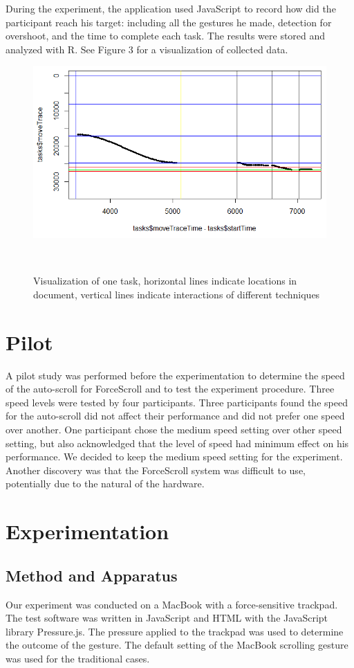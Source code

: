 \documentclass{sigchi}
\begin{document}
During the experiment, the application used JavaScript to record how did the participant reach his target: including all the gestures he made, detection for overshoot, and the time to complete each task. The results were stored and analyzed with R. See Figure 3 for a visualization of collected data.

\begin{figure}[!h]
	\centering
	\includegraphics[width=0.9\columnwidth]{figures/Picture1}
	\caption{Visualization of one task, horizontal lines indicate locations in document, vertical lines indicate interactions of different techniques}~\label{fig:figure3}
\end{figure}

\section{Pilot}
A pilot study was performed before the experimentation to determine the speed of the auto-scroll for ForceScroll and to test the experiment procedure. Three speed levels were tested by four participants. Three participants found the speed for the auto-scroll did not affect their performance and did not prefer one speed over another. One participant chose the medium speed setting over other speed setting, but also acknowledged that the level of speed had minimum effect on his performance. We decided to keep the medium speed setting for the experiment. Another discovery was that the ForceScroll system was difficult to use, potentially due to the natural of the hardware.   


\section{Experimentation}

\subsection{Method and Apparatus}
Our experiment was conducted on a MacBook with a force-sensitive trackpad. The test software was written in JavaScript and HTML with the JavaScript library Pressure.js. The pressure applied to the trackpad was used to determine the outcome of the gesture. The default setting of the MacBook scrolling gesture was used for the traditional cases.
\end{document}
